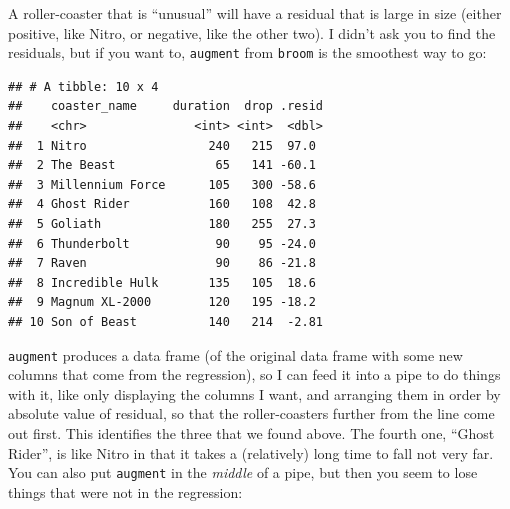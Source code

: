 \documentclass[]{tufte-book}
\newenvironment{Shaded}{}{}
\newcommand{\DataTypeTok}[1]{\textcolor[rgb]{0.56,0.13,0.00}{#1}}
\newcommand{\FloatTok}[1]{\textcolor[rgb]{0.25,0.63,0.44}{#1}}
\newcommand{\KeywordTok}[1]{\textcolor[rgb]{0.00,0.44,0.13}{\textbf{#1}}}
\newcommand{\NormalTok}[1]{#1}
\newcommand{\OperatorTok}[1]{\textcolor[rgb]{0.40,0.40,0.40}{#1}}
\newcommand{\StringTok}[1]{\textcolor[rgb]{0.25,0.44,0.63}{#1}}
\theoremstyle{definition}
\theoremstyle{definition}
\theoremstyle{definition}
\theoremstyle{remark}
\begin{document}
A roller-coaster that is ``unusual'' will have a residual that is large
in size (either positive, like Nitro, or negative, like the other two).
I didn't ask you to find the residuals, but if you want to,
\texttt{augment} from \texttt{broom} is the smoothest way to go:

\begin{Shaded}
\end{Shaded}

\begin{verbatim}
## # A tibble: 10 x 4
##    coaster_name     duration  drop .resid
##    <chr>               <int> <int>  <dbl>
##  1 Nitro                 240   215  97.0 
##  2 The Beast              65   141 -60.1 
##  3 Millennium Force      105   300 -58.6 
##  4 Ghost Rider           160   108  42.8 
##  5 Goliath               180   255  27.3 
##  6 Thunderbolt            90    95 -24.0 
##  7 Raven                  90    86 -21.8 
##  8 Incredible Hulk       135   105  18.6 
##  9 Magnum XL-2000        120   195 -18.2 
## 10 Son of Beast          140   214  -2.81
\end{verbatim}

\texttt{augment} produces a data frame (of the original data frame with
some new columns that come from the regression), so I can feed it into a
pipe to do things with it, like only displaying the columns I want, and
arranging them in order by absolute value of residual, so that the
roller-coasters further from the line come out first. This identifies
the three that we found above. The fourth one, ``Ghost Rider'', is like
Nitro in that it takes a (relatively) long time to fall not very far.
You can also put \texttt{augment} in the \emph{middle} of a pipe, but
then you seem to lose things that were not in the regression:

\begin{Shaded}
\end{Shaded}
\end{document}
